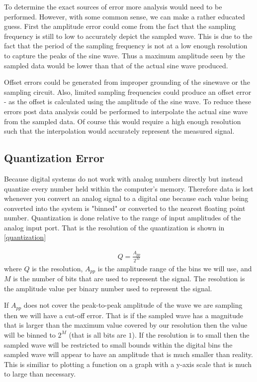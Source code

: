 \documentclass[main.tex]{subfile}
\begin{document}
To determine the exact sources of error more analysis would need to be
performed. However, with some common sense, we can make a rather educated guess.
First the amplitude error could come from the fact that the sampling frequency
is still to low to accurately depict the sampled wave. This is due to the fact
that the period of the sampling frequency is not at a low enough resolution to
capture the peaks of the sine wave. Thus a maximum amplitude seen by the sampled
data would be lower than that of the actual sine wave produced. 

Offset errors could be generated from improper grounding of the sinewave or the
sampling circuit. Also, limited sampling frequencies could produce an offset
error - as the offset is calculated using the amplitude of the sine wave. To
reduce these errors post data analysis could be performed to interpolate the
actual sine wave from the sampled data. Of course this would require a high
enough resolution such that the interpolation would accurately represent the
measured signal.

\subsection{Quantization Error}
\label{sec:quantization_error}

Because digital systems do not work with analog numbers directly but instead
quantize every number held within the computer's memory. Therefore data is lost
whenever you convert an analog signal to a digital one because each value being
converted into the system is "binned" or converted to the nearest floating point
number. Quantization is done relative to the range of input amplitudes of the
analog input port. That is the resolution of the quantization is shown in
\eqref{quantization}

\begin{align}
	Q = \frac{A_{pp}}{2^M}\label{eq:quantization}
\end{align}
where $Q$ is the resolution, $A_{pp}$ is the amplitude range of the bins we will
use, and $M$ is the number of bits that are used to represent the signal. The
resolution is the amplitude value per binary number used to represent the
signal.

If $A_{pp}$ does not cover the peak-to-peak amplitude of the wave we are
sampling then we will have a cut-off error. That is if the sampled wave has a
magnitude that is larger than the maximum value covered by our resolution then
the value will be binned to $2^M$ (that is all bits are $1$). If the resolution
is to small then the sampled wave will be restricted to small bounds within the
digital bins the sampled wave will appear to have an amplitude that is much
smaller than reality. This is similiar to plotting a function on a graph with a
y-axis scale that is much to large than necessary.
\end{document}
